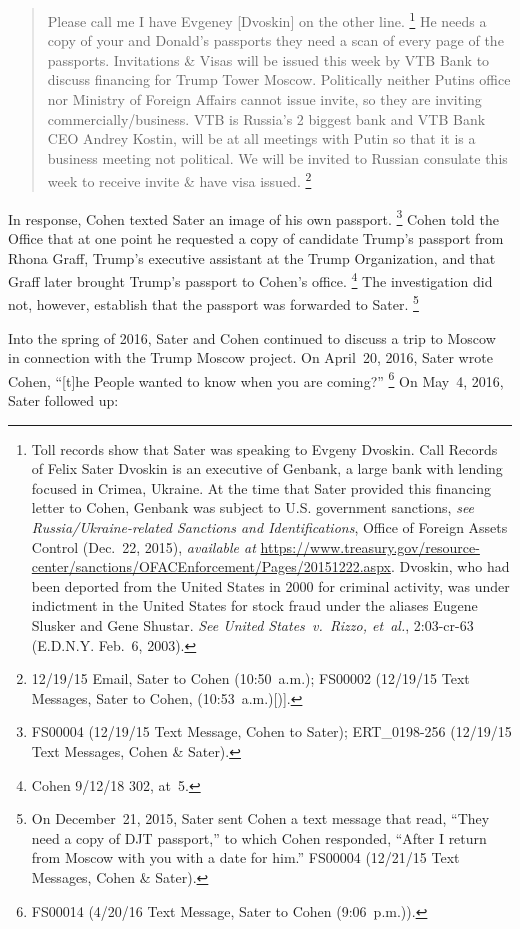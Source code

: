 \begin{quote}
Please call me I have Evgeney [Dvoskin] on the other line.%
\footnote{Toll records show that Sater was speaking to Evgeny Dvoskin.
Call Records of Felix Sater
Dvoskin is an executive of Genbank, a large bank with lending focused in Crimea, Ukraine.
At the time that Sater provided this financing letter to Cohen, Genbank was subject to U.S. government sanctions,
\textit{see Russia/Ukraine-related Sanctions and Identifications}, Office of Foreign Assets Control (Dec.~22, 2015), \textit{available at} \url{https://www.treasury.gov/resource-center/sanctions/OFACEnforcement/Pages/20151222.aspx}.
Dvoskin, who had been deported from the United States in 2000 for criminal activity, was under indictment in the United States for stock fraud under the aliases Eugene Slusker and Gene Shustar.
\textit{See United States~v.\ Rizzo, et~al.}, 2:03-cr-63 (E.D.N.Y. Feb.~6, 2003).}
He needs a copy of your and Donald's passports they need a scan of every page of the passports.
Invitations \& Visas will be issued this week by VTB Bank to discuss financing for Trump Tower Moscow. Politically neither Putins office nor Ministry of Foreign Affairs cannot issue invite, so they are inviting commercially/business.
VTB is Russia's 2 biggest bank and VTB Bank CEO Andrey Kostin, will be at all meetings with Putin so that it is a business meeting not political.
We will be invited to Russian consulate this week to receive invite \& have visa issued.%
\footnote{12/19/15 Email, Sater to Cohen (10:50~a.m.);
FS00002 (12/19/15 Text Messages, Sater to Cohen, (10:53~a.m.)[)].}
\end{quote}

In response, Cohen texted Sater an image of his own passport.%
\footnote{FS00004 (12/19/15 Text Message, Cohen to Sater);
ERT\_0198-256 (12/19/15 Text Messages, Cohen \& Sater).}
Cohen told the Office that at one point he requested a copy of candidate Trump's passport from Rhona Graff, Trump's executive assistant at the Trump Organization, and that Graff later brought Trump's passport to Cohen's office.%
\footnote{Cohen 9/12/18 302, at~5.}
The investigation did not, however, establish that the passport was forwarded to Sater.%
\footnote{On December~21, 2015, Sater sent Cohen a text message that read, ``They need a copy of DJT passport,'' to which Cohen responded, ``After I return from Moscow with you with a date for him.''
FS00004 (12/21/15 Text Messages, Cohen \& Sater).}

Into the spring of 2016, Sater and Cohen continued to discuss a trip to Moscow in connection with the Trump Moscow project.
On April~20, 2016, Sater wrote Cohen, ``[t]he People wanted to know when you are coming?''%
\footnote{FS00014 (4/20/16 Text Message, Sater to Cohen (9:06~p.m.)).}
On May~4, 2016, Sater followed up:

